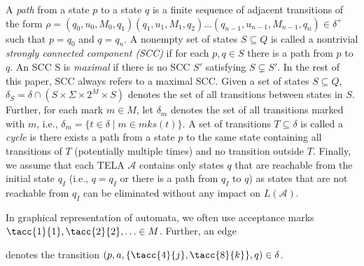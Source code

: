 \documentclass[a4paper,UKenglish,cleveref, autoref, thm-restate]{lipics-v2021}
\newcommand{\todo}[1]{\textcolor{red}{#1}}
\newcommand{\mks}{\mathit{mks}}
\newcommand{\mA}{\mathcal{A}}
\begin{document}
A \emph{path} from a state $p$ to a state $q$ is a finite sequence of
adjacent transitions of the form
$\rho=(q_0,u_0,M_0,q_1)(q_1,u_1,M_1,q_2)\dots(q_{n-1},u_{n-1},M_{n-1},q_n)\in\delta^+$
such that $p=q_0$ and $q=q_n$. A nonempty set of states $S\subseteq Q$
is called a nontrivial \emph{strongly connected component (SCC)} if
for each $p,q\in S$ there is a path from $p$ to $q$. An SCC S is
\emph{maximal} if there is no SCC $S'$ satisfying $S\subsetneq S'$. In
the rest of this paper, SCC always refers to a maximal SCC. Given a
set of states $S\subseteq Q$, $\delta_S=\delta\cap (S\times \Sigma \times 2^M \times S)$
denotes the set of all transitions between states in $S$. Further, for
each mark $m\in M$, let $\delta_m$ denotes the set of all transitions
marked with $m$, i.e., $\delta_m=\{t\in\delta\mid m\in
\mks(t)\}$.
A set of transitions $T\subseteq\delta$ is called a \emph{cycle} is
there exists a path from a state $p$ to the same state containing all
transitions of $T$ (potentially multiple times) and no transition
outside $T$. Finally, we assume that each TELA $\mA$ contains only
states $q$ that are reachable from the initial state $q_I$ (i.e.,
$q=q_I$ or there is a path from $q_I$ to $q$) as states that are not
reachable from $q_I$ can be eliminated without any impact on $L(\mA)$.

In graphical representation of automata, we often use acceptance marks
$\tacc{1}{1},\tacc{2}{2},\ldots\in M$. Further, an edge 
denotes the transition $(p,a,\{\tacc{4}{j},\tacc{8}{k}\},q)\in\delta$. 

\bigskip
\end{document}
